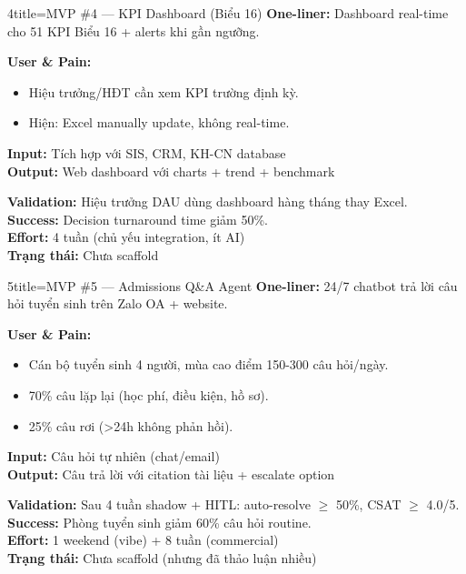 \documentclass[11pt,a4paper]{article}
\begin{document}
\begin{mvpbox}{4}{title=MVP \#4 — KPI Dashboard (Biểu 16)}
\textbf{One-liner:} Dashboard real-time cho 51 KPI Biểu 16 + alerts khi gần ngưỡng.

\textbf{User \& Pain:}
\begin{itemize}
\item Hiệu trưởng/HĐT cần xem KPI trường định kỳ.
\item Hiện: Excel manually update, không real-time.
\end{itemize}

\textbf{Input:} Tích hợp với SIS, CRM, KH-CN database\\
\textbf{Output:} Web dashboard với charts + trend + benchmark

\textbf{Validation:} Hiệu trưởng DAU dùng dashboard hàng tháng thay Excel.\\
\textbf{Success:} Decision turnaround time giảm 50\%.\\
\textbf{Effort:} 4 tuần (chủ yếu integration, ít AI)\\
\textbf{Trạng thái:} Chưa scaffold
\end{mvpbox}

\begin{mvpbox}{5}{title=MVP \#5 — Admissions Q\&A Agent}
\textbf{One-liner:} 24/7 chatbot trả lời câu hỏi tuyển sinh trên Zalo OA + website.

\textbf{User \& Pain:}
\begin{itemize}
\item Cán bộ tuyển sinh 4 người, mùa cao điểm 150-300 câu hỏi/ngày.
\item 70\% câu lặp lại (học phí, điều kiện, hồ sơ).
\item 25\% câu rơi (>24h không phản hồi).
\end{itemize}

\textbf{Input:} Câu hỏi tự nhiên (chat/email)\\
\textbf{Output:} Câu trả lời với citation tài liệu + escalate option

\textbf{Validation:} Sau 4 tuần shadow + HITL: auto-resolve $\geq$ 50\%, CSAT $\geq$ 4.0/5.\\
\textbf{Success:} Phòng tuyển sinh giảm 60\% câu hỏi routine.\\
\textbf{Effort:} 1 weekend (vibe) + 8 tuần (commercial)\\
\textbf{Trạng thái:} Chưa scaffold (nhưng đã thảo luận nhiều)
\end{mvpbox}
\end{document}

